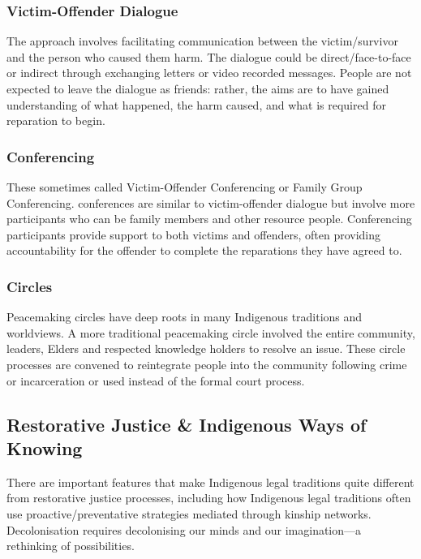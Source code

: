 \documentclass{article}
\begin{document}
\subsubsection*{Victim-Offender Dialogue}

The approach involves facilitating communication between the victim/survivor and the person who caused them harm. The dialogue could be direct/face-to-face or indirect through exchanging letters or video recorded messages. People are not expected to leave the dialogue as friends: rather, the aims are to have gained understanding of what happened, the harm caused, and what is required for reparation to begin.

\subsubsection*{Conferencing}

These sometimes called Victim-Offender Conferencing or Family Group Conferencing. conferences are similar to victim-offender dialogue but involve more participants who can be family members and other resource people. Conferencing participants provide support to both victims and offenders, often providing accountability for the offender to complete the reparations they have agreed to.

\subsubsection*{Circles}

Peacemaking circles have deep roots in many Indigenous traditions and worldviews.  A more traditional peacemaking circle involved the entire community, leaders, Elders and respected knowledge holders to resolve an issue. These circle processes are convened to reintegrate people into the community following crime or incarceration or used instead of the formal court process.

\subsection{Restorative Justice \& Indigenous Ways of Knowing}

There are important features that make Indigenous legal traditions quite different from restorative justice processes, including how Indigenous legal traditions often use proactive/preventative strategies mediated through kinship networks. Decolonisation requires decolonising our minds and our imagination—a rethinking of possibilities.
\end{document}

